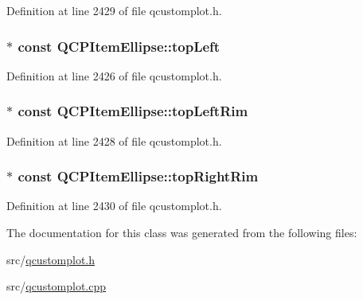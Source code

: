 Definition at line 2429 of file qcustomplot.\-h.

\hypertarget{class_q_c_p_item_ellipse_a12fd8420c06718d0c8a2303d6a652848}{
\subsubsection[{top\-Left}]{$\ast$ const Q\-C\-P\-Item\-Ellipse\-::top\-Left}}\label{class_q_c_p_item_ellipse_a12fd8420c06718d0c8a2303d6a652848}


Definition at line 2426 of file qcustomplot.\-h.

\hypertarget{class_q_c_p_item_ellipse_a33ebd2a751b63b9240edc9aa46c19eff}{
\subsubsection[{top\-Left\-Rim}]{$\ast$ const Q\-C\-P\-Item\-Ellipse\-::top\-Left\-Rim}}\label{class_q_c_p_item_ellipse_a33ebd2a751b63b9240edc9aa46c19eff}


Definition at line 2428 of file qcustomplot.\-h.

\hypertarget{class_q_c_p_item_ellipse_a744446970b38a4a3bbea46d722b7c54d}{
\subsubsection[{top\-Right\-Rim}]{$\ast$ const Q\-C\-P\-Item\-Ellipse\-::top\-Right\-Rim}}\label{class_q_c_p_item_ellipse_a744446970b38a4a3bbea46d722b7c54d}


Definition at line 2430 of file qcustomplot.\-h.



The documentation for this class was generated from the following files\-:\begin{DoxyCompactItemize}
\item 
src/\hyperlink{qcustomplot_8h}{qcustomplot.\-h}\item 
src/\hyperlink{qcustomplot_8cpp}{qcustomplot.\-cpp}\end{DoxyCompactItemize}

